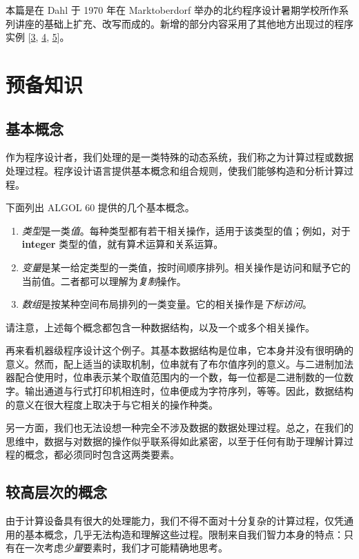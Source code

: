 \documentclass[twoside,11pt,fontset=none]{ctexbook}
\begin{document}
本篇是在 Dahl 于 1970 年在 Marktoberdorf 举办的北约程序设计暑期学校所作系列讲座的基础上扩充、改写而成的。新增的部分内容采用了其他地方出现过的程序实例 [\hyperref[ref:3]{3}, \hyperref[ref:4]{4}, \hyperref[ref:5]{5}]。

\section{预备知识}

\subsection{基本概念}

作为程序设计者，我们处理的是一类特殊的动态系统，我们称之为计算过程或数据处理过程。程序设计语言提供基本概念和组合规则，使我们能够构造和分析计算过程。

下面列出 ALGOL 60 提供的几个基本概念。

\begin{enumerate}[wide, nosep, label=(\arabic*)]
	\item \textit{类型}是一类\textit{值}。每种类型都有若干相关操作，适用于该类型的值；例如，对于 \textbf{integer} 类型的值，就有算术运算和关系运算。
	\item \textit{变量}是某一给定类型的一类值，按时间顺序排列。相关操作是访问和赋予它的当前值。二者都可以理解为\textit{复制}操作。
	\item \textit{数组}是按某种空间布局排列的一类变量。它的相关操作是\textit{下标访问}。
\end{enumerate}

请注意，上述每个概念都包含一种数据结构，以及一个或多个相关操作。

再来看机器级程序设计这个例子。其基本数据结构是位串，它本身并没有很明确的意义。然而，配上适当的读取机制，位串就有了布尔值序列的意义。与二进制加法器配合使用时，位串表示某个取值范围内的一个数，每一位都是二进制数的一位数字。输出通道与行式打印机相连时，位串便成为字符序列，等等。因此，数据结构的意义在很大程度上取决于与它相关的操作种类。

另一方面，我们也无法设想一种完全不涉及数据的数据处理过程。总之，在我们的思维中，数据与对数据的操作似乎联系得如此紧密，以至于任何有助于理解计算过程的概念，都必须同时包含这两类要素。

\subsection{较高层次的概念}

由于计算设备具有很大的处理能力，我们不得不面对十分复杂的计算过程，仅凭通用的基本概念，几乎无法构造和理解这些过程。限制来自我们智力本身的特点：只有在一次考虑\textit{少量}要素时，我们才可能精确地思考。
\end{document}
